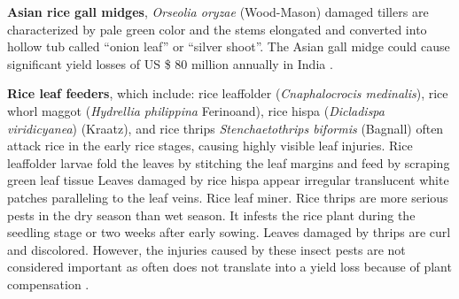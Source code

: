 \documentclass[12pt, oneside]{report}
\begin{document}
\textbf{Asian rice gall midges}, \textit{Orseolia oryzae} (Wood-Mason) damaged tillers are characterized by pale green color and the stems elongated and converted into hollow tub called ``onion leaf'' or ``silver shoot''\citep{pathak1994insect}. The Asian gall midge could cause significant yield losses of US \$ 80 million annually in India \citep{bennett2004new}. 

\textbf{Rice leaf feeders}, which include: rice leaffolder (\textit{Cnaphalocrocis medinalis}), rice whorl maggot (\textit{Hydrellia philippina} Ferinoand), rice hispa (\textit{Dicladispa viridicyanea}) (Kraatz), and  rice thrips \textit{Stenchaetothrips biformis} (Bagnall) often attack rice in the early rice stages, causing highly visible leaf injuries.  Rice leaffolder larvae fold the leaves by stitching the leaf margins and feed by scraping green leaf tissue Leaves damaged by rice hispa appear irregular translucent white patches paralleling to the leaf veins. Rice leaf miner. Rice thrips are more serious pests in the dry season than wet season. It infests the rice plant during the seedling stage or two weeks after early sowing. Leaves damaged by thrips are curl and discolored. However, the injuries caused by these insect pests are not considered important as often does not translate into a yield loss because of plant compensation \citep{pathak1994insect, shepard1995rice}. 
\end{document}
